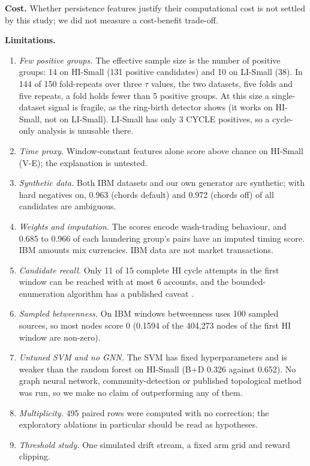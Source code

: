 \documentclass[conference]{IEEEtran}
\begin{document}
\textbf{Cost.} Whether persistence features justify their computational cost is not settled by this study; we did not measure a cost-benefit trade-off.

\textbf{Limitations.}
\begin{enumerate}
\item \emph{Few positive groups.} The effective sample size is the number of positive groups: 14 on HI-Small (131 positive candidates) and 10 on LI-Small (38). In 144 of 150 fold-repeats over three $\tau$ values, the two datasets, five folds and five repeats, a fold holds fewer than 5 positive groups. At this size a single-dataset signal is fragile, as the ring-birth detector shows (it works on HI-Small, not on LI-Small). LI-Small has only 3 CYCLE positives, so a cycle-only analysis is unusable there.
\item \emph{Time proxy.} Window-constant features alone score above chance on HI-Small (V-E); the explanation is untested.
\item \emph{Synthetic data.} Both IBM datasets and our own generator are synthetic; with hard negatives on, 0.963 (chords default) and 0.972 (chords off) of all candidates are ambiguous.
\item \emph{Weights and imputation.} The scores encode wash-trading behaviour, and 0.685 to 0.966 of each laundering group's pairs have an imputed timing score. IBM amounts mix currencies. IBM data are not market transactions.
\item \emph{Candidate recall.} Only 11 of 15 complete HI cycle attempts in the first window can be reached with at most 6 accounts, and the bounded-enumeration algorithm has a published caveat \cite{bauernoppel2025bounded}.
\item \emph{Sampled betweenness.} On IBM windows betweenness uses 100 sampled sources, so most nodes score 0 (0.1594 of the 404{,}273 nodes of the first HI window are non-zero).
\item \emph{Untuned SVM and no GNN.} The SVM has fixed hyperparameters and is weaker than the random forest on HI-Small (B+D 0.326 against 0.652). No graph neural network, community-detection or published topological method was run, so we make no claim of outperforming any of them.
\item \emph{Multiplicity.} 495 paired rows were computed with no correction; the exploratory ablations in particular should be read as hypotheses.
\item \emph{Threshold study.} One simulated drift stream, a fixed arm grid and reward clipping.
\end{enumerate}
\end{document}
